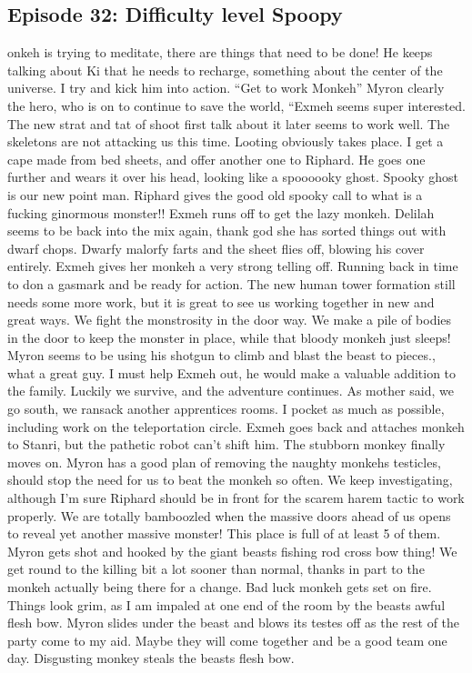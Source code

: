 \subsection{Episode 32: Difficulty level Spoopy}
onkeh is trying to meditate, there are things that need to be done! He keeps talking about Ki that he needs to recharge, something about the center of the universe. I try and kick him into action. ``Get to work Monkeh''\medskip
Myron clearly the hero, who is on to continue to save the world, “Exmeh seems super interested. The new strat and tat of shoot first talk about it later seems to work well. The skeletons are not attacking us this time. Looting obviously takes place. I get a cape made from bed sheets, and offer another one to Riphard. He goes one further and wears it over his head, looking like a spoooooky ghost. Spooky ghost is our new point man.\medskip
Riphard gives the good old spooky call to what is a fucking ginormous monster!! Exmeh runs off to get the lazy monkeh. Delilah seems to be back into the mix again, thank god she has sorted things out with dwarf chops. Dwarfy malorfy farts and the sheet flies off, blowing his cover entirely.\medskip
Exmeh gives her monkeh a very strong telling off. Running back in time to don a gasmark and be ready for action. The new human tower formation still needs some more work, but it is great to see us working together in new and great ways. We fight the monstrosity in the door way. We make a pile of bodies in the door to keep the monster in place, while that bloody monkeh just sleeps! Myron seems to be using his shotgun to climb and blast the beast to pieces., what a great guy. I must help Exmeh out, he would make a valuable addition to the family. Luckily we survive, and the adventure continues.\medskip
As mother said, we go south, we ransack another apprentices rooms. I pocket as much as possible, including work on the teleportation circle.\medskip
Exmeh goes back and attaches monkeh to Stanri, but the pathetic robot can’t shift him. The stubborn monkey finally moves on. Myron has a good plan of removing the naughty monkehs testicles, should stop the need for us to beat the monkeh so often.\medskip
We keep investigating, although I’m sure Riphard should be in front for the scarem harem tactic to work properly. We are totally bamboozled when the massive doors ahead of us opens to reveal yet another massive monster! This place is full of at least 5 of them.\medskip
Myron gets shot and hooked by the giant beasts fishing rod cross bow thing! We get round to the killing bit a lot sooner than normal, thanks in part to the monkeh actually being there for a change. Bad luck monkeh gets set on fire. Things look grim, as I am impaled at one end of the room by the beasts awful flesh bow. Myron slides under the beast and blows its testes off as the rest of the party come to my aid. Maybe they will come together and be a good team one day. Disgusting monkey steals the beasts flesh bow.\medskip
